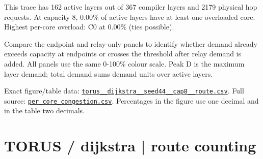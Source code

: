 \documentclass[10pt,a4paper]{article}
\begin{document}
This trace has 162 active layers out of 367 compiler layers and 2179 physical hop requests. At capacity 8, 0.00\% of active layers have at least one overloaded core. Highest per-core overload: C0 at 0.00\% (ties possible).\par
Compare the endpoint and relay-only panels to identify whether demand already exceeds capacity at endpoints or crosses the threshold after relay demand is added. All panels use the same 0-100\% colour scale. Peak D is the maximum layer demand; total demand sums demand units over active layers.\par
Exact figure/table data: \href{\detokenize{file:///home/dhruv-pansuriya/Documents/BTP/Compiler-Driven-ACE/output/pdf/qaoa_methods_congestion/tables/torus__dijkstra__seed44__cap8__route.csv}}{\nolinkurl{torus__dijkstra__seed44__cap8__route.csv}}. Full source: \href{\detokenize{file:///home/dhruv-pansuriya/Documents/BTP/Compiler-Driven-ACE/results/qaoa_2seed_2026-10-26/congestion/per_core_congestion.csv}}{\nolinkurl{per_core_congestion.csv}}. Percentages in the figure use one decimal and in the table two decimals.\par
\clearpage
\section*{TORUS / dijkstra | route counting}
\end{document}
